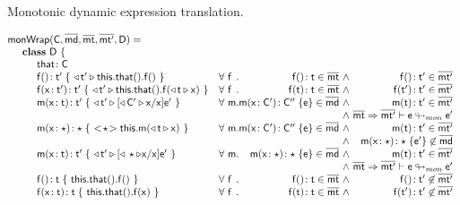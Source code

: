 \documentclass[a4paper,USenglish]{tex/lipics-v2016}
\begin{document}
\begin{figure}[!ht]
\begin{mathpar}

\end{mathpar}

\vspace{-2mm}
\hrulefill
\caption{Monotonic dynamic expression translation.}\label{montrans}
\end{figure}


\begin{figure}[!ht]
\hrulefill 
\footnotesize
\vspace{4mm}
\[\begin{array}{@{}ll@{}l@{}r@{~}c@{~}r}
    \classgen{\C, \b\md, \bmt, \bmtp, \D} = \\
\SP \class ~\D ~ \{\\
\SPP \Fdef\that\C \\
\SPP \Mdefz\f{\tp}{~\MonCast\tp{\Get{\Get\this\that}\f}~}
&    \All \f \Mtype\f{}\t\in\bmt &\wedge& \Mtype\f{}\tp \in \bmtp
\\
\SPP \Mdef\f\x\tp\tp {~\MonCast\tp{\Set{\Get\this\that}\f{\MonCast\t\x}}~}
&    \All \f \Mtype\f\t\t \in \bmt &\wedge& \Mtype\f\tp\tp \in \bmtp
\\
\SPP \Mdef\m\x\t\tp {~\MonCast\tp{{[\MonCast\Cp\x / \x] \ep}}~}
&     \All \m \Mdef\m\x\Cp\Cpp\e\in\b\md &\wedge& \Mtype\m\t\tp\in\bmtp \\
&&&&\wedge&\rtranstz{\bmt}\bmtp{\e}{\ep}
\\
\SPP \Mdef\m\x\any\any {~\SubCast\any{\Call\this\m{\MonCast{\t}\x}}~}
&     \All \m \Mdef\m\x\Cp\Cpp\e\in\b\md &\wedge& \Mtype\m\t\tp\in\bmtp\\
&&&&\wedge&\Mdef\m\x\any\any{\e'}\not\in\b\md
\\
\SPP \Mdef\m\x\t\tp{~\MonCast\tp{[\MonCast\any\x/\x]\ep}~}
&     \All \m \Mdef\m\x\any\any\e\in\b\md &\wedge& \Mtype\m\t\tp\in\bmtp \\
&&&&\wedge&\rtranstz{\bmt}\bmtp{\e}{\ep}
\\
\SPP \Mdefz\f\t { ~\Get{\Get\this\that}\f~}
&    \All \f \Mtype\f{}\t \in \bmt &\wedge& \Mtype\f{}\tp \not\in \bmtp
\\
\SPP \Mdef\f\x\t\t { ~\Set{\Get\this\that}\f\x~}
&    \All \f \Mtype\f\t\t \in \bmt&\wedge& \Mtype\f\tp\tp \not\in \bmtp

\end{array}\]
\end{figure}
\end{document}

